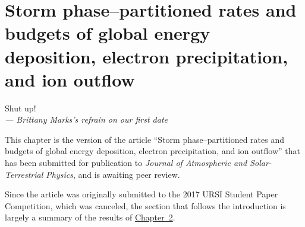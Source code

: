 
\chapter{Storm phase--partitioned rates and budgets of global \Alfic
  energy deposition, electron precipitation, and ion outflow}
\label{chp:3}

\begin{flushright}
  \begin{minipage}[]{0.5\linewidth}
    \begin{flushright}
      Shut up!  \\{\small \emph{--- Brittany Marks's refrain on our first date } }
    \end{flushright}
  \end{minipage}
\end{flushright}
\vspace{\baselineskip}

This chapter is the version of the article ``Storm phase--partitioned rates and
budgets of global \Alfic energy deposition, electron precipitation, and ion
outflow'' that has been submitted for publication to \emph{Journal of
  Atmospheric and Solar-Terrestrial Physics}, and is awaiting peer review.

Since the article was originally submitted to the 2017 URSI Student Paper
Competition, which was canceled, the section that follows the introduction is
largely a summary of the results of \hyperref[chp:2]{Chapter~2}.

